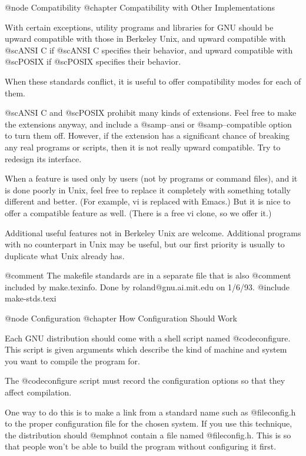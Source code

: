 @node Compatibility
@chapter Compatibility with Other Implementations

With certain exceptions, utility programs and libraries for GNU should
be upward compatible with those in Berkeley Unix, and upward compatible
with @sc{ANSI} C if @sc{ANSI} C specifies their behavior, and upward
compatible with @sc{POSIX} if @sc{POSIX} specifies their behavior.

When these standards conflict, it is useful to offer compatibility
modes for each of them.

@sc{ANSI} C and @sc{POSIX} prohibit many kinds of extensions.  Feel
free to make the extensions anyway, and include a @samp{--ansi} or
@samp{--compatible} option to turn them off.  However, if the extension
has a significant chance of breaking any real programs or scripts,
then it is not really upward compatible.  Try to redesign its
interface.

When a feature is used only by users (not by programs or command
files), and it is done poorly in Unix, feel free to replace it
completely with something totally different and better.  (For example,
vi is replaced with Emacs.)  But it is nice to offer a compatible
feature as well.  (There is a free vi clone, so we offer it.)

Additional useful features not in Berkeley Unix are welcome.
Additional programs with no counterpart in Unix may be useful,
but our first priority is usually to duplicate what Unix already
has.

@comment The makefile standards are in a separate file that is also
@comment included by make.texinfo.  Done by roland@gnu.ai.mit.edu on 1/6/93.
@include make-stds.texi

@node Configuration
@chapter How Configuration Should Work

Each GNU distribution should come with a shell script named
@code{configure}.  This script is given arguments which describe the
kind of machine and system you want to compile the program for.

The @code{configure} script must record the configuration options so
that they affect compilation.

One way to do this is to make a link from a standard name such as
@file{config.h} to the proper configuration file for the chosen system.
If you use this technique, the distribution should @emph{not} contain a
file named @file{config.h}.  This is so that people won't be able to
build the program without configuring it first.

